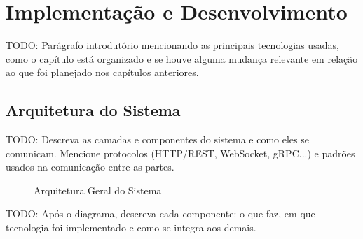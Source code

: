 %
%

\chapter{Implementação e Desenvolvimento}
\label{cap:implementacao}

TODO: Parágrafo introdutório mencionando as principais tecnologias usadas,
como o capítulo está organizado e se houve alguma mudança relevante em
relação ao que foi planejado nos capítulos anteriores.


\section{Arquitetura do Sistema}
\label{sec:arquitetura}

TODO: Descreva as camadas e componentes do sistema e como eles se
comunicam. Mencione protocolos (HTTP/REST, WebSocket, gRPC...) e padrões
usados na comunicação entre as partes.

\begin{figure}[H]
  \caption{Arquitetura Geral do Sistema}
  \label{fig:arquitetura}
  \centering
  \fbox{\rule{0pt}{5cm}\rule{0.85\textwidth}{0pt}} %
\end{figure}

TODO: Após o diagrama, descreva cada componente: o que faz, em que
tecnologia foi implementado e como se integra aos demais.



